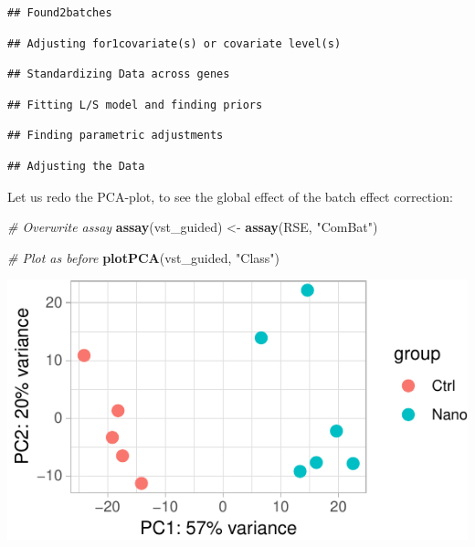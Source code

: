 \documentclass[9pt,a4paper,]{extarticle}
\newenvironment{Shaded}{\begin{snugshade}}{\end{snugshade}}
\newcommand{\KeywordTok}[1]{\textcolor[rgb]{0.13,0.29,0.53}{\textbf{{#1}}}}
\newcommand{\StringTok}[1]{\textcolor[rgb]{0.31,0.60,0.02}{{#1}}}
\newcommand{\CommentTok}[1]{\textcolor[rgb]{0.56,0.35,0.01}{\textit{{#1}}}}
\newcommand{\NormalTok}[1]{{#1}}
\begin{document}
\begin{verbatim}
## Found2batches
\end{verbatim}

\begin{verbatim}
## Adjusting for1covariate(s) or covariate level(s)
\end{verbatim}

\begin{verbatim}
## Standardizing Data across genes
\end{verbatim}

\begin{verbatim}
## Fitting L/S model and finding priors
\end{verbatim}

\begin{verbatim}
## Finding parametric adjustments
\end{verbatim}

\begin{verbatim}
## Adjusting the Data
\end{verbatim}

Let us redo the PCA-plot, to see the global effect of the batch effect correction:

\begin{Shaded}
\begin{Highlighting}[]
\CommentTok{# Overwrite assay }
\KeywordTok{assay}\NormalTok{(vst_guided) <-}\StringTok{ }\KeywordTok{assay}\NormalTok{(RSE, }\StringTok{"ComBat"}\NormalTok{)}

\CommentTok{# Plot as before}
\KeywordTok{plotPCA}\NormalTok{(vst_guided, }\StringTok{"Class"}\NormalTok{)}
\end{Highlighting}
\end{Shaded}

\begin{center}\includegraphics{CAGEWorkflow_files/figure-latex/correctedPCA-1} \end{center}
\end{document}
